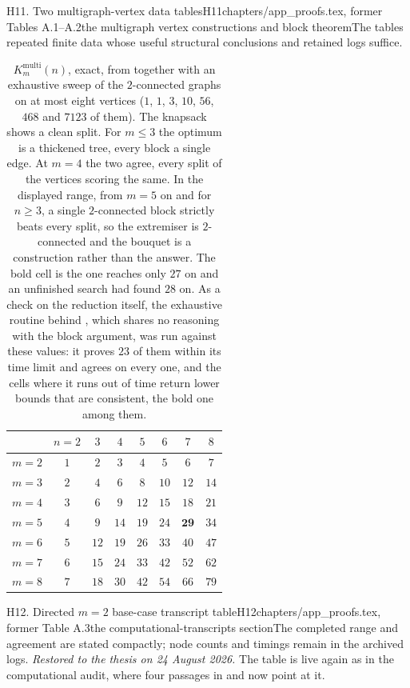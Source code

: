 \begin{offcut}{H11. Two multigraph-vertex data tables}{H11}{chapters/app\_proofs.tex, former Tables A.1--A.2}{the multigraph vertex constructions and block theorem}{The tables repeated finite data whose useful structural conclusions and retained logs suffice.}
\begin{table}[ht]
\centering
\begin{tabular}{l|ccccccc}
    & $n=2$ & $3$ & $4$ & $5$ & $6$ & $7$ & $8$ \\
    \midrule
    $m=2$ & $1$ & $2$ & $3$ & $4$ & $5$ & $6$ & $7$ \\
    $m=3$ & $2$ & $4$ & $6$ & $8$ & $10$ & $12$ & $14$ \\
    $m=4$ & $3$ & $6$ & $9$ & $12$ & $15$ & $18$ & $21$ \\
    $m=5$ & $4$ & $9$ & $14$ & $19$ & $24$ & $\mathbf{29}$ & $34$ \\
    $m=6$ & $5$ & $12$ & $19$ & $26$ & $33$ & $40$ & $47$ \\
    $m=7$ & $6$ & $15$ & $24$ & $33$ & $42$ & $52$ & $62$ \\
    $m=8$ & $7$ & $18$ & $30$ & $42$ & $54$ & $66$ & $79$ \\
\end{tabular}
\caption{$K_m^{\mathrm{multi}}(n)$, exact, from  together with an exhaustive sweep of the $2$-connected graphs on at most eight vertices ($1$, $1$, $3$, $10$, $56$, $468$ and $7123$ of them). The knapsack shows a clean split. For $m \le 3$ the optimum is a thickened tree, every block a single edge. At $m = 4$ the two agree, every split of the vertices scoring the same. In the displayed range, from $m = 5$ on and for $n\ge3$, a single $2$-connected block strictly beats every split, so the extremiser is $2$-connected and the bouquet is a construction rather than the answer. The bold cell is the one  reaches only $27$ on and an unfinished search had found $28$ on. As a check on the reduction itself, the exhaustive routine behind , which shares no reasoning with the block argument, was run against these values: it proves $23$ of them within its time limit and agrees on every one, and the cells where it runs out of time return lower bounds that are consistent, the bold one among them.}
\label{tab:multi-vertex-exact}
\end{table}
\end{offcut}

\begin{offcut}{H12. Directed \(m=2\) base-case transcript table}{H12}{chapters/app\_proofs.tex, former Table A.3}{the computational-transcripts section}{The completed range and agreement are stated compactly; node counts and timings remain in the archived logs.}
\emph{Restored to the thesis on 24 August 2026.} The table is live again as  in the computational audit, where four passages in  and  now point at it.
\end{offcut}

